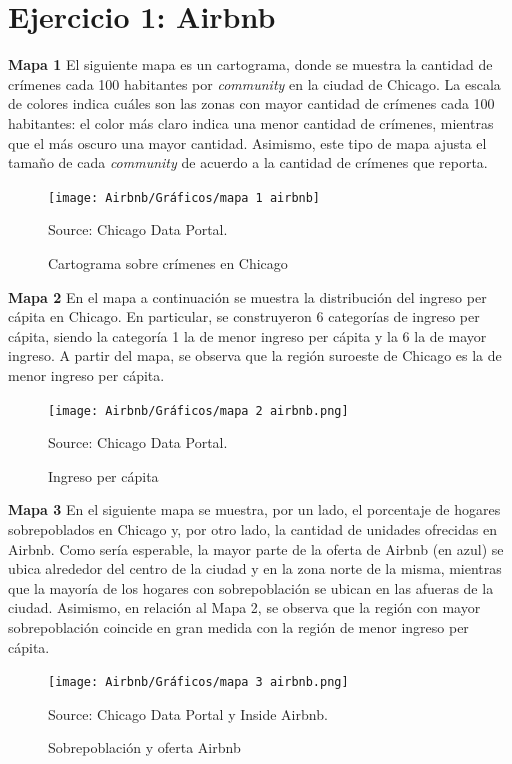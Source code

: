 \documentclass[11pt]{article}
\newcommand{\source}[1]{\caption*{Source: {#1}} }
\begin{document}
\section*{Ejercicio 1: Airbnb} 

\textbf{Mapa 1}
El siguiente mapa es un cartograma, donde se muestra la cantidad de crímenes cada 100 habitantes por \textit{community} en la ciudad de Chicago. La escala de colores indica cuáles son las zonas con mayor cantidad de crímenes cada 100 habitantes: el color más claro indica una menor cantidad de crímenes, mientras que el más oscuro una mayor cantidad. Asimismo, este tipo de mapa ajusta el tamaño de cada \textit{community} de acuerdo a la cantidad de crímenes que reporta.

\begin{figure}[H]
    \centering
    \caption{Cartograma sobre crímenes en Chicago}
	\texttt{[image: Airbnb/Gráficos/mapa 1 airbnb]}    
    \source{Chicago Data Portal.}
    \label{fig:carto}
\end{figure}

\newpage
\textbf{Mapa 2} En el mapa a continuación se muestra la distribución del ingreso per cápita en Chicago. En particular, se construyeron 6 categorías de ingreso per cápita, siendo la categoría 1 la de menor ingreso per cápita y la 6 la de mayor ingreso. A partir del mapa, se observa que la región suroeste de Chicago es la de menor ingreso per cápita.


\begin{figure}[H]
    \centering
    \caption{Ingreso per cápita}
    \texttt{[image: Airbnb/Gráficos/mapa 2 airbnb.png]}
    \source{Chicago Data Portal.}
    \label{fig:i_pc}
\end{figure}


\newpage
\textbf{Mapa 3} En el siguiente mapa se muestra, por un lado, el porcentaje de hogares sobrepoblados en Chicago y, por otro lado, la cantidad de unidades ofrecidas en Airbnb. Como sería esperable, la mayor parte de la oferta de Airbnb (en azul) se ubica alrededor del centro de la ciudad y en la zona norte de la misma, mientras que la mayoría de los hogares con sobrepoblación se ubican en las afueras de la ciudad. Asimismo, en relación al Mapa 2, se observa que la región con mayor sobrepoblación coincide en gran medida con la región de menor ingreso per cápita. 


\begin{figure}[H]
    \centering
    \caption{Sobrepoblación y oferta Airbnb}
    \texttt{[image: Airbnb/Gráficos/mapa 3 airbnb.png]}
    \source{Chicago Data Portal y Inside Airbnb.}
    \label{fig:crowd_air}
\end{figure}
\end{document}
